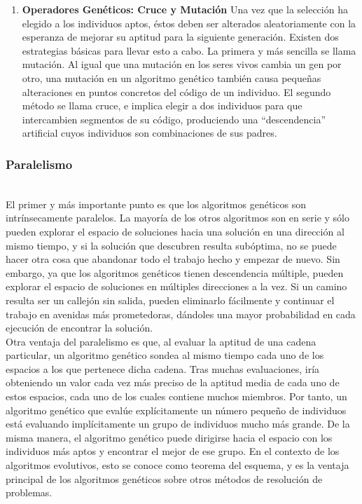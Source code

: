 \documentclass{article}
\begin{document}
\begin{enumerate}
    \item \textbf{Operadores Genéticos: Cruce y Mutación} Una vez que la selección ha elegido a los individuos aptos, éstos deben ser alterados
    aleatoriamente con la esperanza de mejorar su aptitud para la siguiente generación.
    Existen dos estrategias básicas para llevar esto a cabo. La primera y más sencilla se
    llama mutación. Al igual que una mutación en los seres vivos cambia un gen por otro,
    una mutación en un algoritmo genético también causa pequeñas alteraciones en puntos
    concretos del código de un individuo.
    El segundo método se llama cruce, e implica elegir a dos individuos para que
    intercambien segmentos de su código, produciendo una “descendencia” artificial cuyos
    individuos son combinaciones de sus padres. \\

\end{enumerate}

\subsubsection{Paralelismo}\\
El primer y más importante punto es que los algoritmos genéticos son
intrínsecamente paralelos. La mayoría de los otros algoritmos son en serie y sólo
pueden explorar el espacio de soluciones hacia una solución en una dirección al mismo
tiempo, y si la solución que descubren resulta subóptima, no se puede hacer otra cosa
que abandonar todo el trabajo hecho y empezar de nuevo. Sin embargo, ya que los algoritmos genéticos tienen descendencia múltiple, pueden explorar el espacio de soluciones en múltiples direcciones a la vez. Si un camino resulta ser un callejón sin salida, pueden eliminarlo fácilmente y continuar el trabajo en avenidas más prometedoras, dándoles una mayor probabilidad en cada ejecución de encontrar la solución.\\

Otra ventaja del paralelismo es que, al evaluar la aptitud de una cadena particular, un algoritmo genético sondea al mismo tiempo cada uno de los espacios a los que pertenece dicha cadena. Tras muchas evaluaciones, iría obteniendo un valor cada vez más preciso de la aptitud media de cada uno de estos espacios, cada uno de los cuales contiene muchos miembros. Por tanto, un algoritmo genético que evalúe explícitamente un número pequeño de individuos está evaluando implícitamente un grupo de individuos mucho más grande. De la misma manera, el algoritmo genético puede dirigirse hacia el espacio con los individuos más aptos y encontrar el mejor de ese grupo. En el contexto de los algoritmos evolutivos, esto se conoce como teorema del esquema, y es la ventaja principal de los algoritmos genéticos sobre otros métodos de resolución de problemas. 
\end{document}
